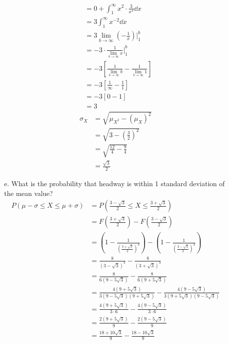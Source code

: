 \documentclass[letterpaper,12pt]{article}
\begin{document}
\begin{enumerate}
\begin{enumerate}
\begin{align*}
          &= 0 + \int_{1}^{\infty} x^2 \cdot \frac{3}{x^4} \dd{x} \\
          &= 3 \int_{1}^{\infty} x^{-2} \dd{x} \\
          &= 3 \lim_{b \to \infty} \left(-\frac{1}{x}\right) \bigg\rvert_{1}^{b} \\
          &= -3 \cdot \frac{1}{\lim_{b \to \infty} x} \bigg\rvert_{1}^{b} \\
          &= -3 \left[\frac{1}{\lim_{b \to \infty} b} - \frac{1}{\lim_{b \to \infty} 1}\right] \\
          &= -3 \left[\frac{1}{\infty} - \frac{1}{1}\right] \\
          &= -3 [0 - 1] \\
          &= 3
        \end{align*}
        \begin{align*}
          \sigma_X &= \sqrt{\mu_{X^2} - (\mu_X)^2} \\
          &= \sqrt{3 - \left(\frac{3}{2}\right)^2} \\
          &= \sqrt{\frac{12}{4} - \frac{9}{4}} \\
          &= \frac{\sqrt{3}}{2}
        \end{align*}
      \item[e.]
        What is the probability that headway is within 1 standard deviation of the mean value?
        \begin{align*}
          P(\mu - \sigma \le X \le \mu + \sigma) &= P\left(\frac{3 - \sqrt{3}}{2} \le X \le \frac{3 + \sqrt{3}}{2}\right) \\
          &= F\left(\frac{3 + \sqrt{3}}{2}\right) - F\left(\frac{3 - \sqrt{3}}{2}\right) \\
          &= \left(1 - \frac{1}{\left(\frac{3 + \sqrt{3}}{2}\right)^3}\right) - \left(1 - \frac{1}{\left(\frac{3 - \sqrt{3}}{2}\right)^3}\right) \\
          &= \frac{8}{(3 - \sqrt{3})^3} - \frac{8}{(3 + \sqrt{3})^3} \\
          &= \frac{8}{6(9 - 5\sqrt{3})} - \frac{8}{6(9 + 5\sqrt{3})} \\
          &= \frac{4(9 + 5\sqrt{3})}{3(9 - 5\sqrt{3})(9 + 5\sqrt{3})} - \frac{4(9 - 5\sqrt{3})}{3(9 + 5\sqrt{3})(9 - 5\sqrt{3})} \\
          &= \frac{4(9 + 5\sqrt{3})}{3 \cdot 6} - \frac{4(9 - 5\sqrt{3})}{3 \cdot 6} \\
          &= \frac{2(9 + 5\sqrt{3})}{9} - \frac{2(9 - 5\sqrt{3})}{9} \\
          &= \frac{18 + 10\sqrt{3}}{9} - \frac{18 - 10\sqrt{3}}{9} \\

\end{align*}
\end{enumerate}
\end{enumerate}
\end{document}
